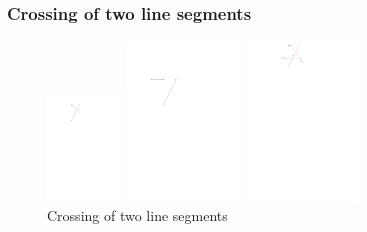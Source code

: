 \subsubsection{Crossing of two line segments}
\begin{figure}[H]
		\includegraphics[width=2cm]{figures/crosses.pdf}
		\caption{}
		\label{fig:crosses_a}
	\endminipage\hfill
		\includegraphics[width=3cm]{figures/crosses1.pdf}
		\caption{}
		\label{fig:crosses_b}
	\endminipage\hfill
		\includegraphics[width=3cm]{figures/crosses2.pdf}
		\caption{}
		\label{fig:crosses_c}
		\endminipage\hfill
	\caption{Crossing of two line segments}
\end{figure}

